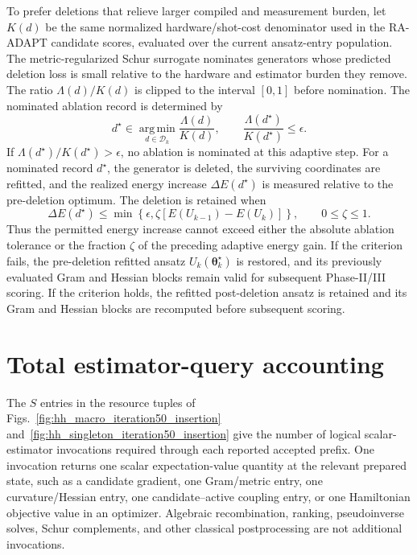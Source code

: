\documentclass[
  reprint,
  amsmath,
  amssymb,
  aps,
  pra,
  nofootinbib,
  superscriptaddress,
  floatfix
]{revtex4-2}
\begin{document}
To prefer deletions that relieve larger compiled and measurement burden, let
\(K(d)\) be the same normalized hardware/shot-cost denominator used in the RA-ADAPT
candidate scores, evaluated over the current ansatz-entry population. The
metric-regularized Schur surrogate nominates generators whose predicted
deletion loss is small relative to the hardware and estimator burden they
remove. The ratio
\(\Lambda(d)/K(d)\) is clipped to the interval \([0,1]\) before nomination.
The nominated ablation record is determined by
\begin{equation*}
d^\star
\in
\operatorname*{arg\,min}_{d\in\mathcal D_k}
\frac{\Lambda(d)}{K(d)},
\qquad
\frac{\Lambda(d^\star)}{K(d^\star)}
\le
\epsilon .
\end{equation*}
If \(\Lambda(d^\star)/K(d^\star)>\epsilon\), no ablation is nominated at this
adaptive step.
For a nominated record \(d^\star\), the generator is deleted, the surviving
coordinates are refitted, and the realized energy increase
\(\Delta E(d^\star)\) is measured relative to the pre-deletion optimum. The
deletion is retained when
\begin{equation*}
\Delta E(d^\star)
\le
\min\!\left\{
\epsilon,
\zeta\left[E(U_{k-1})-E(U_k)\right]
\right\},
\qquad 0\le\zeta\le1.
\end{equation*}
Thus the permitted energy increase cannot exceed either the absolute ablation
tolerance or the fraction \(\zeta\) of the preceding adaptive energy gain. If
the criterion fails, the pre-deletion refitted ansatz
\(U_k(\boldsymbol\theta_k^\star)\) is restored, and its previously evaluated
Gram and Hessian blocks remain valid for subsequent Phase-II/III scoring. If
the criterion holds, the refitted post-deletion ansatz is retained and its Gram
and Hessian blocks are recomputed before subsequent scoring.




\section{Total estimator-query accounting}
\label{app:estimator_queries}
The \(S\) entries in the resource tuples of
Figs.~\ref{fig:hh_macro_iteration50_insertion}
and~\ref{fig:hh_singleton_iteration50_insertion} give the number of logical
scalar-estimator invocations required through each reported accepted prefix.
One invocation returns one scalar expectation-value quantity at the
relevant prepared state, such as a candidate gradient, one Gram/metric entry,
one curvature/Hessian entry, one candidate--active coupling entry, or one
Hamiltonian objective value in an optimizer. Algebraic recombination, ranking,
pseudoinverse solves, Schur complements, and other classical postprocessing
are not additional invocations.
\end{document}
